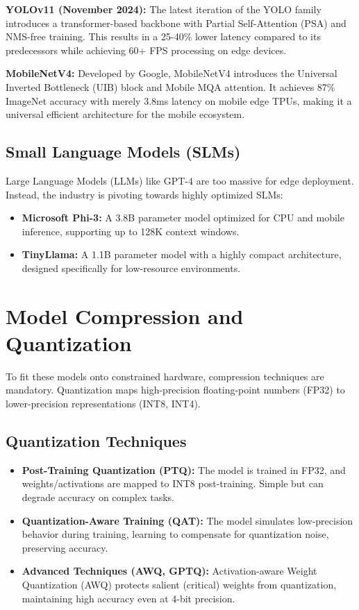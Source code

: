 \documentclass[12pt, a4paper]{article}
\begin{document}
\textbf{YOLOv11 (November 2024):} The latest iteration of the YOLO family introduces a transformer-based backbone with Partial Self-Attention (PSA) and NMS-free training. This results in a 25-40\% lower latency compared to its predecessors while achieving 60+ FPS processing on edge devices.

\textbf{MobileNetV4:} Developed by Google, MobileNetV4 introduces the Universal Inverted Bottleneck (UIB) block and Mobile MQA attention. It achieves 87\% ImageNet accuracy with merely 3.8ms latency on mobile edge TPUs, making it a universal efficient architecture for the mobile ecosystem.

\subsection{Small Language Models (SLMs)}
Large Language Models (LLMs) like GPT-4 are too massive for edge deployment. Instead, the industry is pivoting towards highly optimized SLMs:
\begin{itemize}
    \item \textbf{Microsoft Phi-3:} A 3.8B parameter model optimized for CPU and mobile inference, supporting up to 128K context windows.
    \item \textbf{TinyLlama:} A 1.1B parameter model with a highly compact architecture, designed specifically for low-resource environments.
\end{itemize}

\section{Model Compression and Quantization}
To fit these models onto constrained hardware, compression techniques are mandatory. Quantization maps high-precision floating-point numbers (FP32) to lower-precision representations (INT8, INT4).

\subsection{Quantization Techniques}
\begin{itemize}
    \item \textbf{Post-Training Quantization (PTQ):} The model is trained in FP32, and weights/activations are mapped to INT8 post-training. Simple but can degrade accuracy on complex tasks.
    \item \textbf{Quantization-Aware Training (QAT):} The model simulates low-precision behavior during training, learning to compensate for quantization noise, preserving accuracy.
    \item \textbf{Advanced Techniques (AWQ, GPTQ):} Activation-aware Weight Quantization (AWQ) protects salient (critical) weights from quantization, maintaining high accuracy even at 4-bit precision.
\end{itemize}
\end{document}

